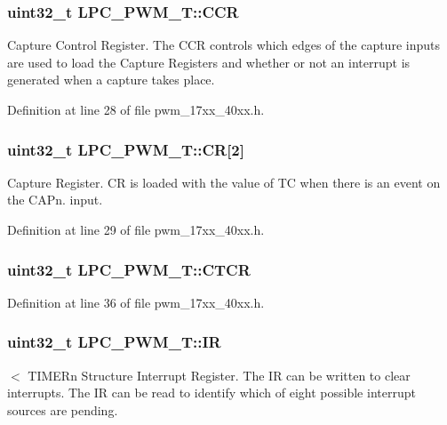 \subsubsection[{\texorpdfstring{C\+CR}{CCR}}]{ uint32\+\_\+t L\+P\+C\+\_\+\+P\+W\+M\+\_\+\+T\+::\+C\+CR}\hypertarget{structLPC__PWM__T_a18c9b3bd596a16bb8586637d967e7aaf}{}\label{structLPC__PWM__T_a18c9b3bd596a16bb8586637d967e7aaf}
Capture Control Register. The C\+CR controls which edges of the capture inputs are used to load the Capture Registers and whether or not an interrupt is generated when a capture takes place. 

Definition at line 28 of file pwm\+\_\+17xx\+\_\+40xx.\+h.

\subsubsection[{\texorpdfstring{CR}{CR}}]{ uint32\+\_\+t L\+P\+C\+\_\+\+P\+W\+M\+\_\+\+T\+::\+CR\mbox{[}2\mbox{]}}\hypertarget{structLPC__PWM__T_aa4ea116945188624a93dae9a0bfc99ca}{}\label{structLPC__PWM__T_aa4ea116945188624a93dae9a0bfc99ca}
Capture Register. CR is loaded with the value of TC when there is an event on the C\+A\+Pn. input. 

Definition at line 29 of file pwm\+\_\+17xx\+\_\+40xx.\+h.

\subsubsection[{\texorpdfstring{C\+T\+CR}{CTCR}}]{ uint32\+\_\+t L\+P\+C\+\_\+\+P\+W\+M\+\_\+\+T\+::\+C\+T\+CR}\hypertarget{structLPC__PWM__T_aa04ba740491fd2bb3193b33269244992}{}\label{structLPC__PWM__T_aa04ba740491fd2bb3193b33269244992}


Definition at line 36 of file pwm\+\_\+17xx\+\_\+40xx.\+h.

\subsubsection[{\texorpdfstring{IR}{IR}}]{ uint32\+\_\+t L\+P\+C\+\_\+\+P\+W\+M\+\_\+\+T\+::\+IR}\hypertarget{structLPC__PWM__T_a5f9b67e6edcb90f7c475f029df300abc}{}\label{structLPC__PWM__T_a5f9b67e6edcb90f7c475f029df300abc}
$<$ T\+I\+M\+E\+Rn Structure Interrupt Register. The IR can be written to clear interrupts. The IR can be read to identify which of eight possible interrupt sources are pending. 

